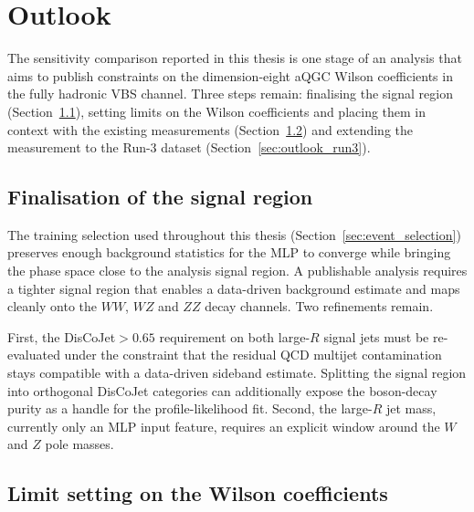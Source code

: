 \chapter{Outlook}
\label{chap:outlook}

The sensitivity comparison reported in this thesis is one stage of an analysis that aims to publish constraints on the dimension-eight aQGC Wilson coefficients in the fully hadronic VBS channel. Three steps remain: finalising the signal region (Section~\ref{sec:outlook_signalregion}), setting limits on the Wilson coefficients and placing them in context with the existing measurements (Section~\ref{sec:outlook_limits}) and extending the measurement to the Run-3 dataset (Section~\ref{sec:outlook_run3}).

\section{Finalisation of the signal region}
\label{sec:outlook_signalregion}

The training selection used throughout this thesis (Section~\ref{sec:event_selection}) preserves enough background statistics for the MLP to converge while bringing the phase space close to the analysis signal region. A publishable analysis requires a tighter signal region that enables a data-driven background estimate and maps cleanly onto the $WW$, $WZ$ and $ZZ$ decay channels. Two refinements remain.

First, the DisCoJet${}>0.65$ requirement on both large-$R$ signal jets must be re-evaluated under the constraint that the residual QCD multijet contamination stays compatible with a data-driven sideband estimate. Splitting the signal region into orthogonal DisCoJet categories can additionally expose the boson-decay purity as a handle for the profile-likelihood fit. Second, the large-$R$ jet mass, currently only an MLP input feature, requires an explicit window around the $W$ and $Z$ pole masses.

\section{Limit setting on the Wilson coefficients}
\label{sec:outlook_limits}

